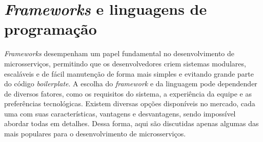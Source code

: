 






\section{\emph{Frameworks} e linguagens de programação}

\emph{Frameworks} desempenham um papel fundamental no desenvolvimento de microsserviços, permitindo que os desenvolvedores criem sistemas modulares, escaláveis e de fácil manutenção de forma mais simples e evitando grande parte do código \emph{boilerplate}. A escolha do \emph{framework} e da linguagem pode dependender de diversos fatores, como os requisitos do sistema, a experiência da equipe e as preferências tecnológicas. Existem diversas opções disponíveis no mercado, cada uma com suas características, vantagens e desvantagens, sendo impossível abordar todas em detalhes. Dessa forma, aqui são discutidas apenas algumas das mais populares para o desenvolvimento de microsserviços.

